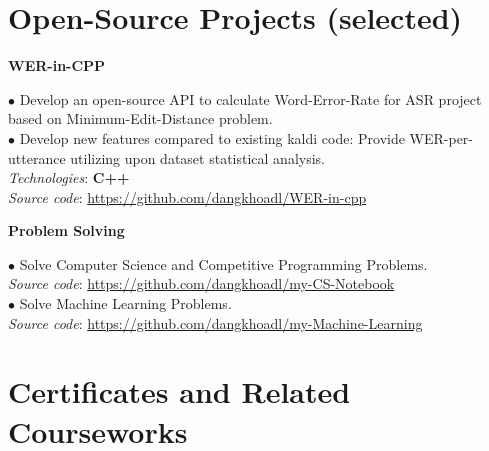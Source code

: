 \documentclass[10pt]{article}
\begin{document}
    \section{Open-Source Projects (selected)}
        \begin{flushleft}
            \textbf{WER-in-CPP}
        \end{flushleft}
        \vspace{-1.5mm}
        $\bullet$ Develop an open-source API to calculate Word-Error-Rate for ASR project based on Minimum-Edit-Distance problem. \\
        $\bullet$ Develop new features compared to existing kaldi code: Provide WER-per-utterance utilizing upon dataset statistical analysis. \\    
            \emph{Technologies}: \textbf{C++} \\
            \emph{Source code}: \href{https://github.com/dangkhoadl/WER-in-cpp}{https://github.com/dangkhoadl/WER-in-cpp} \\

        \begin{flushleft}
            \textbf{Problem Solving}
        \end{flushleft}
        \vspace{-1.5mm}
        $\bullet$ Solve Computer Science and Competitive Programming Problems. \\
        	\emph{Source code}: \href{https://github.com/dangkhoadl/my-CS-Notebook}{https://github.com/dangkhoadl/my-CS-Notebook} \\
        $\bullet$ Solve Machine Learning Problems. \\
        	\emph{Source code}: \href{https://github.com/dangkhoadl/my-Machine-Learning}{https://github.com/dangkhoadl/my-Machine-Learning} \\


    \vspace{2mm}
    \section{Certificates and Related Courseworks}
\end{document}
